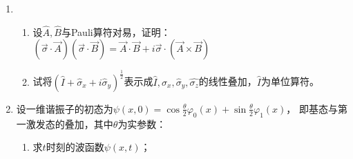 

\begin{enumerate}
	\item


\begin{enumerate}
	\item
设$\hat{A},\hat{B}$与Pauli算符对易，证明：
$(\vec{\sigma}\cdot\vec{A})(\vec{\sigma}\cdot\vec{B})=\vec{A}\cdot\vec{B}+i\vec{\sigma}\cdot(\vec{A}\times\vec{B})$

\item 
试将$(\hat{I}+\hat{\sigma}_x+i\hat{\sigma}_y)^{\frac{1}{2}}$表示成$\hat{I},\hat{\sigma}_x,\hat{\sigma}_y,\hat{\sigma_z}$的线性叠加，$\hat{I}$为单位算符。

\end{enumerate}




\item 
设一维谐振子的初态为$\psi(x,0)=\cos\frac{\theta}{2}\varphi_0(x)+\sin\frac{\theta}{2}\varphi_1(x)$，
即基态与第一激发态的叠加，其中$\theta$为实参数：
\begin{enumerate}
	\item
求$t$时刻的波函数$\psi(x,t)$；


\end{enumerate}
\end{enumerate}
